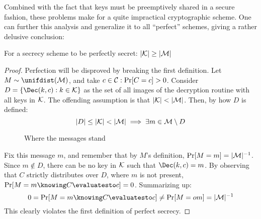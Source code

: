 
Combined with the fact that keys must be preemptively shared in a secure fashion, these problems make for a quite impractical cryptographic scheme. One can further this analysis and generalize it to all ``perfect'' schemes, giving a rather delusive conclusion:

\begin{theorem}
    For a secrecy scheme to be perfectly secret: $|\mathcal{K}| \geq |\mathcal{M}|$
\end{theorem}
\begin{proof}
    Perfection will be disproved by breaking the first definition. Let $M \sim \unifdist(\M)$, and take $c \in \mathcal{C} : \Pr[C = c] > 0$. Consider $D = \{\Dec(k, c) : k \in \K\}$ as the set of all images of the decryption routine with all keys in $\mathcal{K}$. The offending assumption is that $|\mathcal{K}| < |\mathcal{M}|$. Then, by how $D$ is defined:
    \[
        |D| \leq |\mathcal{K}| < |\mathcal{M}| \implies \exists m \in \mathcal{M} \setminus D
    \]

    \begin{figure}[h]
        \centering
        \def\firstcircle{(0,0) circle (1.5cm)}
        \def\secondcircle{(60:0) circle (0.9cm)}
        \caption{Where the messages stand}
    \end{figure}

    Fix this message $m$, and remember that by $M$'s definition, $\Pr[M = m] = |\mathcal{M}|^{-1}$. Since $m \notin D$, there can be no key in $\mathcal{K}$ such that $\Dec(k, c) = m$. By observing that $C$ strictly distributes over $D$, where $m$ is not present, $\Pr[M = m \knowing C \evaluatesto c] = 0$. Summarizing up:
    \[
        0 = \Pr[M = m \knowing C \evaluatesto c] \neq \Pr[M =o m] = |\M|^{-1}
    \]
    This clearly violates the first definition of perfect secrecy.
\end{proof}
